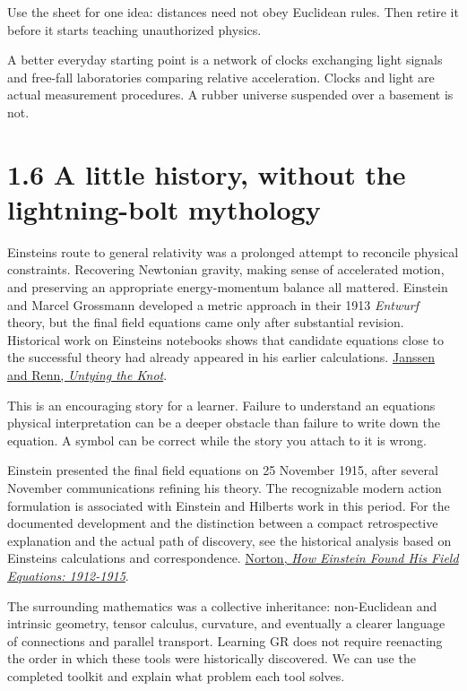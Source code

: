 \documentclass[
  11pt,
  letterpaper,
  oneside,
  openany]{scrbook}
\begin{document}
Use the sheet for one idea: distances need not obey Euclidean rules.
Then retire it before it starts teaching unauthorized physics.

A better everyday starting point is a network of clocks exchanging light
signals and free-fall laboratories comparing relative acceleration.
Clocks and light are actual measurement procedures. A rubber universe
suspended over a basement is not.

\hypertarget{a-little-history-without-the-lightning-bolt-mythology}{%
\section{1.6 A little history, without the lightning-bolt
mythology}\label{a-little-history-without-the-lightning-bolt-mythology}}

Einstein\textquotesingle s route to general relativity was a prolonged
attempt to reconcile physical constraints. Recovering Newtonian gravity,
making sense of accelerated motion, and preserving an appropriate
energy-momentum balance all mattered. Einstein and Marcel Grossmann
developed a metric approach in their 1913 \emph{Entwurf} theory, but the
final field equations came only after substantial revision. Historical
work on Einstein\textquotesingle s notebooks shows that candidate
equations close to the successful theory had already appeared in his
earlier calculations.
\href{https://www.mpiwg-berlin.mpg.de/Preprints/P264.PDF}{Janssen and
Renn, \emph{Untying the Knot}}.

This is an encouraging story for a learner. Failure to understand an
equation\textquotesingle s physical interpretation can be a deeper
obstacle than failure to write down the equation. A symbol can be
correct while the story you attach to it is wrong.

Einstein presented the final field equations on 25 November 1915, after
several November communications refining his theory. The recognizable
modern action formulation is associated with Einstein and
Hilbert\textquotesingle s work in this period. For the documented
development and the distinction between a compact retrospective
explanation and the actual path of discovery, see the historical
analysis based on Einstein\textquotesingle s calculations and
correspondence.
\href{https://online.ucpress.edu/hsns/article/14/2/253/47626/How-Einstein-Found-His-Field-Equations-1912-1915}{Norton,
\emph{How Einstein Found His Field Equations: 1912-1915}}.

The surrounding mathematics was a collective inheritance: non-Euclidean
and intrinsic geometry, tensor calculus, curvature, and eventually a
clearer language of connections and parallel transport. Learning GR does
not require reenacting the order in which these tools were historically
discovered. We can use the completed toolkit and explain what problem
each tool solves.
\end{document}
